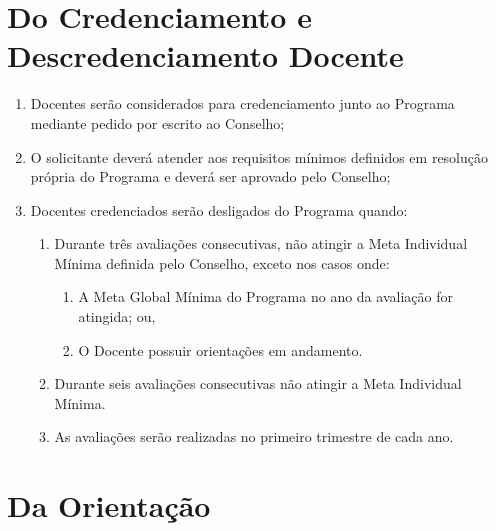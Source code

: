\documentclass{article}
\newcommand{\grupoMaior}{Conselho\xspace}
\begin{document}
\section{Do Credenciamento e Descredenciamento Docente}
\begin{enumerate}
	\item Docentes serão considerados para credenciamento junto ao Programa mediante pedido por escrito ao \grupoMaior;

	\item O solicitante deverá atender aos requisitos mínimos definidos em resolução própria do Programa e deverá ser aprovado pelo \grupoMaior;

	\item Docentes credenciados serão desligados do Programa quando:
	\begin{enumerate}
		\item Durante três avaliações consecutivas, não atingir a Meta Individual Mínima definida pelo \grupoMaior, exceto nos casos onde:
		\begin{enumerate}
			\item A Meta Global Mínima do Programa no ano da avaliação for atingida; ou,
			\item O Docente possuir orientações em andamento.
		\end{enumerate}

		\item Durante seis avaliações consecutivas não atingir a Meta Individual Mínima.

		\item As avaliações serão realizadas no primeiro trimestre de cada ano.
	\end{enumerate}

\end{enumerate}


\section{Da Orientação}
\end{document}
